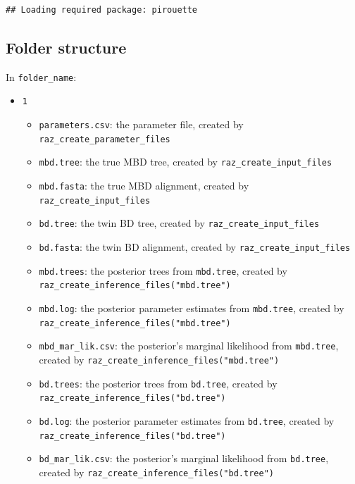 \documentclass[]{article}
\providecommand{\tightlist}{%
  \setlength{\itemsep}{0pt}\setlength{\parskip}{0pt}}
\begin{document}
\begin{verbatim}
## Loading required package: pirouette
\end{verbatim}

\subsection{Folder structure}\label{folder-structure}

In \texttt{folder\_name}:

\begin{itemize}
\tightlist
\item
  \texttt{1}

  \begin{itemize}
  \tightlist
  \item
    \texttt{parameters.csv}: the parameter file, created by
    \texttt{raz\_create\_parameter\_files}
  \item
    \texttt{mbd.tree}: the true MBD tree, created by
    \texttt{raz\_create\_input\_files}
  \item
    \texttt{mbd.fasta}: the true MBD alignment, created by
    \texttt{raz\_create\_input\_files}
  \item
    \texttt{bd.tree}: the twin BD tree, created by
    \texttt{raz\_create\_input\_files}
  \item
    \texttt{bd.fasta}: the twin BD alignment, created by
    \texttt{raz\_create\_input\_files}
  \item
    \texttt{mbd.trees}: the posterior trees from \texttt{mbd.tree},
    created by \texttt{raz\_create\_inference\_files("mbd.tree")}
  \item
    \texttt{mbd.log}: the posterior parameter estimates from
    \texttt{mbd.tree}, created by
    \texttt{raz\_create\_inference\_files("mbd.tree")}
  \item
    \texttt{mbd\_mar\_lik.csv}: the posterior's marginal likelihood from
    \texttt{mbd.tree}, created by
    \texttt{raz\_create\_inference\_files("mbd.tree")}
  \item
    \texttt{bd.trees}: the posterior trees from \texttt{bd.tree},
    created by \texttt{raz\_create\_inference\_files("bd.tree")}
  \item
    \texttt{bd.log}: the posterior parameter estimates from
    \texttt{bd.tree}, created by
    \texttt{raz\_create\_inference\_files("bd.tree")}
  \item
    \texttt{bd\_mar\_lik.csv}: the posterior's marginal likelihood from
    \texttt{bd.tree}, created by
    \texttt{raz\_create\_inference\_files("bd.tree")}

\end{itemize}
\end{itemize}
\end{document}
